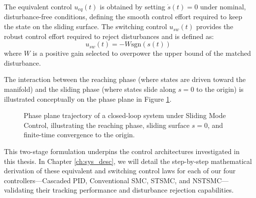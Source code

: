 The equivalent control $u_{eq}(t)$ is obtained by setting $\dot{s}(t) = 0$ under nominal, disturbance-free conditions, defining the smooth control effort required to keep the state on the sliding surface. The switching control $u_{sw}(t)$ provides the robust control effort required to reject disturbances and is defined as:
\begin{equation}
u_{sw}(t) = -W \text{sgn}(s(t))
\end{equation}
where $W$ is a positive gain selected to overpower the upper bound of the matched disturbance. 

The interaction between the reaching phase (where states are driven toward the manifold) and the sliding phase (where states slide along $s=0$ to the origin) is illustrated conceptually on the phase plane in Figure \ref{fig:phase_plane_smc}.

\begin{figure}[h!]
\centering
{}
\caption{Phase plane trajectory of a closed-loop system under Sliding Mode Control, illustrating the reaching phase, sliding surface $s=0$, and finite-time convergence to the origin.}
\label{fig:phase_plane_smc}
\end{figure}

This two-stage formulation underpins the control architectures investigated in this thesis. In Chapter \ref{ch:sys_desc}, we will detail the step-by-step mathematical derivation of these equivalent and switching control laws for each of our four controllers—Cascaded PID, Conventional SMC, STSMC, and NSTSMC—validating their tracking performance and disturbance rejection capabilities.

